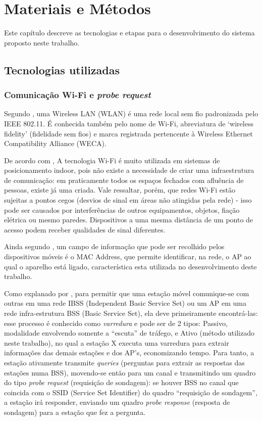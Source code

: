 
\chapter{Materiais e Métodos}
\label{metodologia}
Este capítulo descreve as tecnologias e etapas para o desenvolvimento
do sistema proposto neste trabalho.

\section{Tecnologias utilizadas}
\label{tecnologias-usadas}

\subsection{Comunicação Wi-Fi e \emph{probe request}}

Segundo \cite{Teleco2008}, uma Wireless LAN (WLAN) é uma rede local sem fio padronizada pelo IEEE 802.11. É conhecida também pelo nome de Wi-Fi, abreviatura de ‘wireless fidelity’ (fidelidade sem fios) e marca registrada pertencente à Wireless Ethernet Compatibility Alliance (WECA).

De acordo com \cite{SIMOES2015}, A tecnologia Wi-Fi é muito utilizada em sistemas de posicionamento indoor, pois não existe a necessidade de criar uma infraestrutura de comunicação: em praticamente todos os espaços fechados com afluência de pessoas, existe já uma criada. Vale ressaltar, porém, que redes Wi-Fi estão sujeitas a pontos cegos (desvios de sinal em áreas não atingidas pela rede) - isso pode ser causados por interferências de outros equipamentos, objetos, fiação elétrica ou mesmo paredes. Dispositivos a uma mesma distância de um ponto de acesso podem receber qualidades de sinal diferentes.

Ainda segundo \cite{SIMOES2015}, um campo de informação que pode ser recolhido pelos dispositivos móveis é o MAC Address, que permite identificar, na rede, o AP ao qual o aparelho está ligado, característica esta utilizada no desenvolvimento deste trabalho.

Como explanado por \cite{Teleco2016}, para permitir que uma estação móvel comunique-se com outras em uma rede IBSS (Independent Basic Service Set) ou um AP em uma rede infra-estrutura BSS (Basic Service Set), ela deve primeiramente encontrá-las: esse processo é conhecido como \emph{varredura} e pode ser de 2 tipos: Passivo, modalidade envolvendo somente a “escuta” de tráfego, e Ativo (método utilizado neste trabalho), no qual a estação X executa uma varredura para extrair informações das demais estações e dos AP’s, economizando tempo. Para tanto, a estação ativamente transmite \emph{queries} (perguntas para extrair as respostas das estações numa BSS), movendo-se então para um canal e transmitindo um quadro do tipo \emph{probe request} (requisição de sondagem): se houver BSS no canal que coincida com o SSID (Service Set Identifier) do quadro “requisição de sondagem”, a estação irá responder, enviando um quadro \emph{probe response} (resposta de sondagem) para a estação que fez a pergunta.

